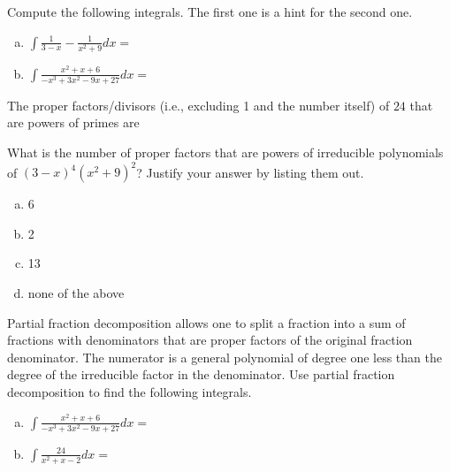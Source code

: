 \documentclass[answers]{exam}
\begin{document}
\begin{questions}

\question Compute the following integrals. The first one is a hint for the second one.\\

\begin{enumerate}[(a)]
	\item $\displaystyle \int \frac{1}{3-x} - \frac{1}{x^2+9} dx =$\\
	
	\item $\displaystyle \int \frac{x^2+x+6}{-x^3+3x^2-9x+27} dx =$\\
	\vspace{.5in}
\end{enumerate}

\question The proper factors/divisors (i.e., excluding 1 and the number itself) of $24$ that are powers of primes are 
\vspace{0.5in}

\question What is the number of proper factors that are powers of irreducible polynomials of $(3-x)^4(x^2+9)^2$? Justify your answer by listing them out.
\begin{enumerate}[(a)]
	\item 6
	\item 2
	\item 13
	\item none of the above
\end{enumerate}

\question Partial fraction decomposition allows one to split a fraction into a sum of fractions with denominators that are proper factors of the original fraction denominator. The numerator is a general polynomial of degree one less than the degree of the irreducible factor in the denominator. Use partial fraction decomposition to find the following integrals. 

\begin{enumerate}[(a)]
	
	\item $\displaystyle \int \frac{x^2+x+6}{-x^3+3x^2-9x+27} dx =$\\
	
	\vspace{2in}
	
	\item $\displaystyle \int \frac{24}{x^2+x-2} dx =$\\
	
	\vspace{2in}
	

\end{enumerate}
\end{questions}
\end{document}
